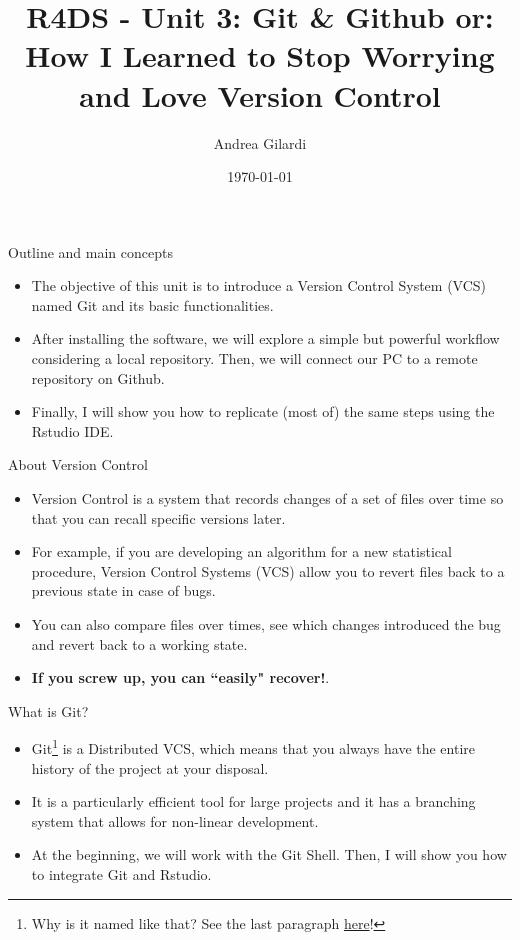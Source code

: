 \documentclass[
hyperref={bookmarks=false},
xcolor={dvipsnames,svgnames*,x11names*}, 
12pt
]{beamer}
\title{R4DS - Unit 3: Git \& Github or: How I Learned to Stop Worrying and Love Version Control\vspace{-1.25cm}}
\author{Andrea Gilardi}
\date{\today}
\begin{document}
\inserttitlepage

\begin{frame}{Outline and main concepts}
\vspace{-0.5cm}
\begin{itemize}
	\itemsep 3ex
	\item The objective of this unit is to introduce a Version Control System (VCS) named Git and its basic functionalities. 
	\item After installing the software, we will explore a simple but powerful workflow considering a local repository. Then, we will connect our PC to a remote repository on Github. 
	\item Finally, I will show you how to replicate (most of) the same steps using the Rstudio IDE. 
\end{itemize}
\end{frame}

\begin{frame}{About Version Control}
\vspace{-0.5cm}
\begin{itemize}
\itemsep 3ex
\item Version Control is a system that records changes of a set of files over time so that you can recall specific versions later.
\item For example, if you are developing an algorithm for a new statistical procedure, Version Control Systems (VCS) allow you to revert files back to a previous state in case of bugs. 
\item You can also compare files over times, see which changes introduced the bug and revert back to a working state. 
\item \textbf{If you screw up, you can ``easily" recover!}. 
\end{itemize}
\end{frame}

\begin{frame}{What is Git?}
\vspace{-0.5cm}
\begin{itemize}
	\itemsep 3ex
	\item Git\footnote{Why is it named like that? See the last paragraph \href{https://github.com/git/git\#readme}{here}!} is a Distributed VCS, which means that you always have the entire history of the project at your disposal.
	\item It is a particularly efficient tool for large projects and it has a branching system that allows for non-linear development. 
	
	\item At the beginning, we will work with the Git Shell. Then, I will show you how to integrate Git and Rstudio. 
\end{itemize}
\end{frame}
\end{document}
